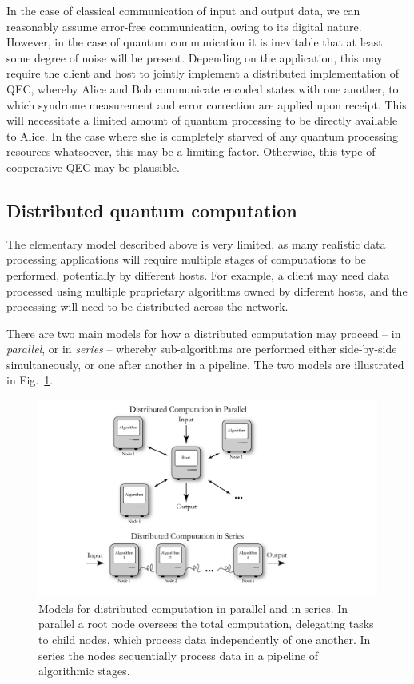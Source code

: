 \documentclass[aps,rmp,twocolumn,amsmath,amssymb,nofootinbib,superscriptaddress,longbibliography,floatfix]{revtex4-1}
\begin{document}
In the case of classical communication of input and output data, we can reasonably assume error-free communication, owing to its digital nature. However, in the case of quantum communication it is inevitable that at least some degree of noise will be present. Depending on the application, this may require the client and host to jointly implement a distributed implementation of QEC, whereby Alice and Bob communicate encoded states with one another, to which syndrome measurement and error correction are applied upon receipt. This will necessitate a limited amount of quantum processing to be directly available to Alice. In the case where she is completely starved of any quantum processing resources whatsoever, this may be a limiting factor. Otherwise, this type of cooperative QEC may be plausible.

%
%

\subsection{Distributed quantum computation} \label{sec:dist_QC}

The elementary model described above is very limited, as many realistic data processing applications will require multiple stages of computations to be performed, potentially by different hosts. For example, a client may need data processed using multiple proprietary algorithms owned by different hosts, and the processing will need to be distributed across the network.

There are two main models for how a distributed computation may proceed -- in \emph{parallel}, or in \emph{series} -- whereby sub-algorithms are performed either side-by-side simultaneously, or one after another in a pipeline. The two models are illustrated in Fig.~\ref{fig:distributed}.

\begin{figure}[!htb]
\includegraphics[width=\columnwidth]{distributed}
\caption{Models for distributed computation in parallel and in series. In parallel a root node oversees the total computation, delegating tasks to child nodes, which process data independently of one another. In series the nodes sequentially process data in a pipeline of algorithmic stages.} \label{fig:distributed}
\end{figure}
\end{document}
